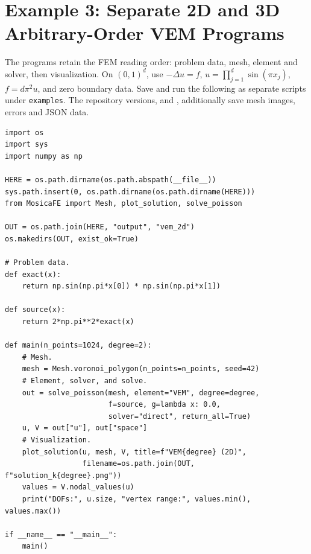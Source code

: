 \documentclass[11pt,oneside]{book}
\theoremstyle{definition}
\theoremstyle{plain}
\newcommand{\code}[1]{\texttt{#1}}
\begin{document}
\section[Example 3: VEM in 2D and 3D]{Example 3: Separate 2D and 3D Arbitrary-Order VEM Programs}
The programs retain the FEM reading order: problem data, mesh, element and solver,
then visualization. On $(0,1)^d$, use $-\Delta u=f$,
$u=\prod_{j=1}^d\sin(\pi x_j)$, $f=d\pi^2u$, and zero boundary data.
Save and run the following as separate scripts under \code{examples}.
The repository versions,  and
, additionally save mesh images, errors and JSON data.

\begin{lstlisting}[language=MosicaFE,caption={Standalone 2D main program}]
import os
import sys
import numpy as np

HERE = os.path.dirname(os.path.abspath(__file__))
sys.path.insert(0, os.path.dirname(os.path.dirname(HERE)))
from MosicaFE import Mesh, plot_solution, solve_poisson

OUT = os.path.join(HERE, "output", "vem_2d")
os.makedirs(OUT, exist_ok=True)

# Problem data.
def exact(x):
    return np.sin(np.pi*x[0]) * np.sin(np.pi*x[1])

def source(x):
    return 2*np.pi**2*exact(x)

def main(n_points=1024, degree=2):
    # Mesh.
    mesh = Mesh.voronoi_polygon(n_points=n_points, seed=42)
    # Element, solver, and solve.
    out = solve_poisson(mesh, element="VEM", degree=degree,
                        f=source, g=lambda x: 0.0,
                        solver="direct", return_all=True)
    u, V = out["u"], out["space"]
    # Visualization.
    plot_solution(u, mesh, V, title=f"VEM{degree} (2D)",
                  filename=os.path.join(OUT, f"solution_k{degree}.png"))
    values = V.nodal_values(u)
    print("DOFs:", u.size, "vertex range:", values.min(), values.max())

if __name__ == "__main__":
    main()
\end{lstlisting}
\end{document}
